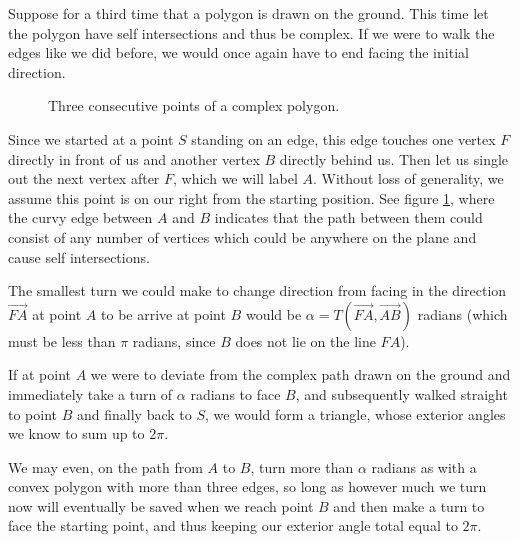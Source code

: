 \documentclass{article}
\newcommand{\vecl}{\overrightarrow} %
\begin{document}
Suppose for a third time that a polygon is drawn on the ground. This time let the polygon have self intersections and thus be complex. If we were to walk the edges like we did before, we would once again have to end facing the initial direction.

\begin{figure}[htbp]
	\centering
	\caption{Three consecutive points of a complex polygon.}
	\label{walk-3}
\end{figure}

Since we started at a point \(S\) standing on an edge, this edge touches one vertex \(F\) directly in front of us and another vertex \(B\) directly behind us. Then let us single out the next vertex after \(F\), which we will label \(A\). Without loss of generality, we assume this point is on our right from the starting position. See figure \ref{walk-3}, where the curvy edge between \(A\) and \(B\) indicates that the path between them could consist of any number of vertices which could be anywhere on the plane and cause self intersections.

The smallest turn we could make to change direction from facing in the direction \(\vecl{FA}\) at point \(A\) to be arrive at point \(B\) would be \(\alpha = T(\vecl{FA}, \vecl{AB})\) radians (which must be less than \(\pi\) radians, since \(B\) does not lie on the line \(FA\)).

If at point \(A\) we were to deviate from the complex path drawn on the ground and immediately take a turn of \(\alpha\) radians to face \(B\), and subsequently walked straight to point \(B\) and finally back to \(S\), we would form a triangle, whose exterior angles we know to sum up to \(2\pi\).

We may even, on the path from \(A\) to \(B\), turn more than \(\alpha\) radians as with a convex polygon with more than three edges, so long as however much we turn now will eventually be saved when we reach point \(B\) and then make a turn to face the starting point, and thus keeping our exterior angle total equal to \(2\pi\).
\end{document}
